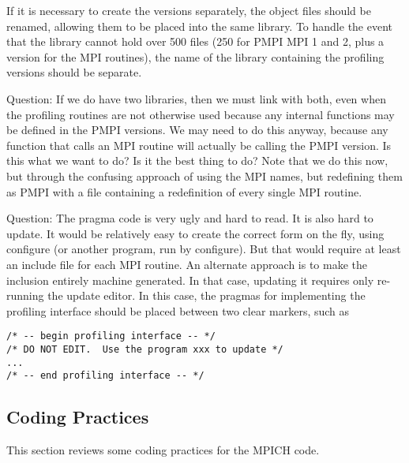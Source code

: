 \documentclass{article}
\begin{document}
If it is necessary to create the  versions separately, the
object files should be renamed, allowing them to be placed into the
same library.  To handle the event that the library cannot hold over
500 files (250 for PMPI MPI 1 and 2, plus a version for the MPI
routines), the name of the library containing the profiling versions
should be separate.

Question: If we do have two libraries, then we must link with both,
even when the profiling routines are not otherwise used because any
internal functions may be defined in the PMPI versions.  We may need
to do this anyway, because any function that calls an MPI routine will
actually be calling the PMPI version.  Is this what we want to do?  Is
it the best thing to do?  Note that we do this now, but through the
confusing approach of using the MPI names, but redefining them as PMPI
with a file containing a redefinition of every single MPI routine.

Question: The pragma code is very ugly and hard to read.  It is also hard to
update.
It would be relatively
easy to create the correct form on the fly, using configure (or
another program, run by configure).  But that
would require at least an include file for each MPI routine.
An alternate approach is to make the inclusion entirely machine
generated.  In that case, updating it requires only re-running the
update editor.  In this case, the pragmas for implementing the
profiling interface should be placed between two clear markers, such
as 
\begin{verbatim}
/* -- begin profiling interface -- */
/* DO NOT EDIT.  Use the program xxx to update */
...
/* -- end profiling interface -- */
\end{verbatim}

\subsection{Coding Practices}
This section reviews some coding practices for the MPICH code.
\end{document}
